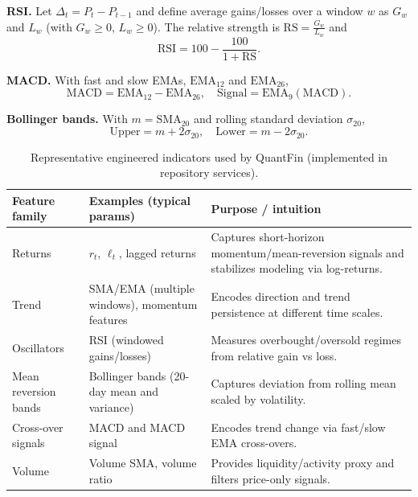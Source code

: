 \documentclass[conference]{IEEEtran}
\begin{document}
\textbf{RSI.} Let $\Delta_t=P_t-P_{t-1}$ and define average gains/losses over a window $w$ as $G_w$ and $L_w$ (with $G_w\ge 0$, $L_w\ge 0$). The relative strength is $\mathrm{RS}=\tfrac{G_w}{L_w}$ and
\begin{equation}
\mathrm{RSI}=100-\frac{100}{1+\mathrm{RS}}.
\end{equation}

\textbf{MACD.} With fast and slow EMAs, $\mathrm{EMA}_{12}$ and $\mathrm{EMA}_{26}$,
\begin{equation}
\mathrm{MACD}=\mathrm{EMA}_{12}-\mathrm{EMA}_{26},\quad \mathrm{Signal}=\mathrm{EMA}_9(\mathrm{MACD}).
\end{equation}

\textbf{Bollinger bands.} With $m=\mathrm{SMA}_{20}$ and rolling standard deviation $\sigma_{20}$,
\begin{equation}
\mathrm{Upper}=m+2\sigma_{20},\quad \mathrm{Lower}=m-2\sigma_{20}.
\end{equation}

\begin{table}[!t]
\centering
\caption{Representative engineered indicators used by QuantFin (implemented in repository services).}
\label{tab:features}
\small
\renewcommand{\arraystretch}{1.15}
\setlength{\tabcolsep}{6pt}
\begin{tabularx}{\textwidth}{|l|l|X|}
\hline
\textbf{Feature family} & \textbf{Examples (typical params)} & \textbf{Purpose / intuition}\\
\hline
Returns & $r_t$, $\ell_t$, lagged returns & Captures short-horizon momentum/mean-reversion signals and stabilizes modeling via log-returns.\\
Trend & SMA/EMA (multiple windows), momentum features & Encodes direction and trend persistence at different time scales.\\
Oscillators & RSI (windowed gains/losses) & Measures overbought/oversold regimes from relative gain vs loss.\\
Mean reversion bands & Bollinger bands (20-day mean and variance) & Captures deviation from rolling mean scaled by volatility.\\
Cross-over signals & MACD and MACD signal & Encodes trend change via fast/slow EMA cross-overs.\\
Volume & Volume SMA, volume ratio & Provides liquidity/activity proxy and filters price-only signals.\\
\hline
\end{tabularx}
\end{table}
\end{document}

